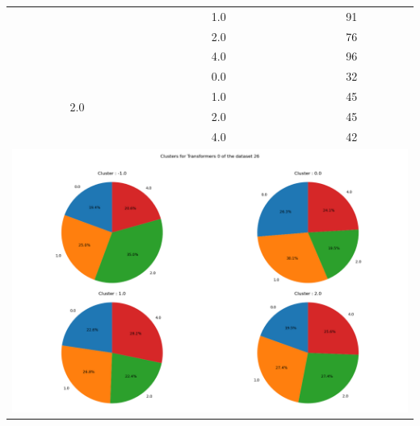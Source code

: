 \begin{longtable}{|c|c|c|c|c|}
& \multicolumn{2}{c|}{1.0} & \multicolumn{2}{c|}{91} \\
& \multicolumn{2}{c|}{2.0} & \multicolumn{2}{c|}{76} \\
& \multicolumn{2}{c|}{4.0} & \multicolumn{2}{c|}{96} \\
\hline
\multirow{4}{*}{2.0} & \multicolumn{2}{c|}{0.0} & \multicolumn{2}{c|}{32} \\
& \multicolumn{2}{c|}{1.0} & \multicolumn{2}{c|}{45} \\
& \multicolumn{2}{c|}{2.0} & \multicolumn{2}{c|}{45} \\
& \multicolumn{2}{c|}{4.0} & \multicolumn{2}{c|}{42} \\
\hline
\multicolumn{5}{|c|}{\includegraphics[width=0.8\linewidth]{img/annexes/26/clustering_pie_charts/Transformers 0.png}} \\
\end{longtable}


